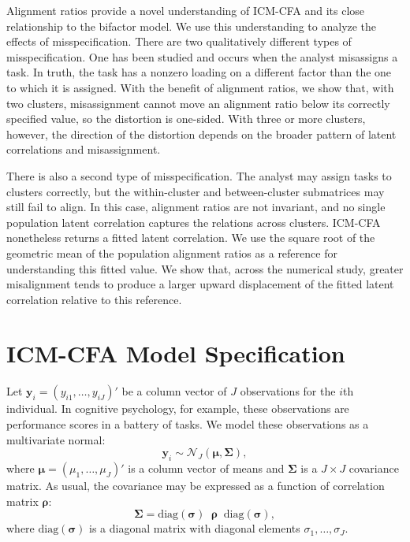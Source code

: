 \documentclass[
  american,
  man,floatsintext]{apa7}
\begin{document}
Alignment ratios provide a novel understanding of ICM-CFA and its close relationship to the bifactor model. We use this understanding to analyze the effects of misspecification. There are two qualitatively different types of misspecification. One has been studied and occurs when the analyst misassigns a task. In truth, the task has a nonzero loading on a different factor than the one to which it is assigned. With the benefit of alignment ratios, we show that, with two clusters, misassignment cannot move an alignment ratio below its correctly specified value, so the distortion is one-sided. With three or more clusters, however, the direction of the distortion depends on the broader pattern of latent correlations and misassignment.

There is also a second type of misspecification. The analyst may assign tasks to clusters correctly, but the within-cluster and between-cluster submatrices may still fail to align. In this case, alignment ratios are not invariant, and no single population latent correlation captures the relations across clusters. ICM-CFA nonetheless returns a fitted latent correlation. We use the square root of the geometric mean of the population alignment ratios as a reference for understanding this fitted value. We show that, across the numerical study, greater misalignment tends to produce a larger upward displacement of the fitted latent correlation relative to this reference.

\section{ICM-CFA Model Specification}\label{icm-cfa-model-specification}

Let \(\pmb{y}_i=(y_{i1},\ldots,y_{iJ})'\) be a column vector of \(J\) observations for the \(i\)th individual. In cognitive psychology, for example, these observations are performance scores in a battery of tasks. We model these observations as a multivariate normal:
\[
\pmb{y}_i \sim \mathcal{N}_J(\pmb{\mu}, \pmb{\Sigma}),
\]
where \(\pmb\mu=(\mu_1,\dots,\mu_J)'\) is a column vector of means and \(\pmb{\Sigma}\) is a \(J\times J\) covariance matrix. As usual, the covariance may be expressed as a function of correlation matrix \(\pmb{\rho}\):
\[
\pmb{\Sigma} = \mathrm{diag}(\pmb{\sigma})\;\; \pmb{\rho}\;\; \mathrm{diag}(\pmb{\sigma}),
\]
where \(\mathrm{diag}(\pmb{\sigma})\) is a diagonal matrix with diagonal elements \(\sigma_1,\ldots,\sigma_J\).
\end{document}
